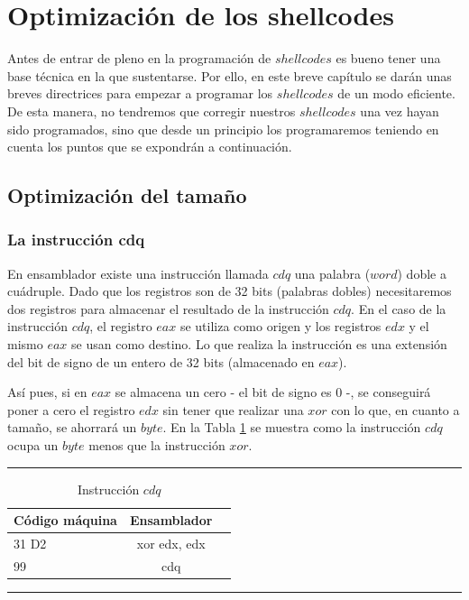 \documentclass [titlepage, 12pt]{article}
\newcommand{\topfigrule}{\hrule\vspace{4 pt}}
\newcommand{\botfigrule}{\hrule\vspace{4 pt}}
\begin{document}
\section{Optimizaci\'on de los shellcodes}
Antes de entrar de pleno en la programaci\'on de $shellcodes$ es bueno tener una base t\'ecnica en la que sustentarse. Por ello, en este breve cap\'itulo se dar\'an unas breves directrices para empezar a programar los $shellcodes$ de un modo eficiente. De esta manera, no tendremos que corregir nuestros $shellcodes$ una vez hayan sido programados, sino que desde un principio los programaremos teniendo en cuenta los puntos que se expondr\'an a continuaci\'on.
\subsection{Optimizaci\'on del tama\~no}
\subsubsection{La instrucci\'on cdq}
En ensamblador existe una instrucci\'on llamada $cdq$ una palabra ($word$) doble a cu\'adruple. Dado que los registros son de 32 bits (palabras dobles) necesitaremos dos registros para almacenar el resultado de la instrucci\'on $cdq$. En el caso de la instrucci\'on $cdq$, el registro $eax$ se utiliza como origen y los registros $edx$ y el mismo $eax$ se usan como destino. Lo que realiza la instrucci\'on es una extensi\'on del bit de signo de un entero de 32 bits (almacenado en $eax$).\bigskip

As\'i pues, si en $eax$ se almacena un cero - el bit de signo es 0 -, se conseguir\'a poner a cero el registro $edx$ sin tener que realizar una $xor$ con lo que, en cuanto a tama\~no, se ahorrar\'a un $byte$. En la Tabla \ref{tab:equivalencias3} se muestra como la instrucci\'on $cdq$ ocupa un $byte$ menos que la instrucci\'on $xor$.\bigskip

\begin{table}[!htp]
	\topfigrule
   	\addtolength{\abovecaptionskip}{-12pt}   	
   	\caption{Instrucci\'on $cdq$}
   	\label{tab:equivalencias3} 	
	\begin{center}
		\begin{tabular}{||l | c | r||}
			\hline
			\hline
			C\'odigo m\'aquina & Ensamblador \\
			\hline
			31 D2 & xor edx, edx\\
			\hline
			99 & cdq\\
			\hline
		\end{tabular}
	\end{center} \botfigrule
\end{table}
\end{document}
